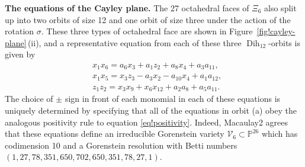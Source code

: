 \documentclass[pdftex]{sigma}
\numberwithin{equation}{section}
\theoremstyle{definition}
\newcommand{\PP}{\mathbb{P}}
\DeclareMathOperator{\Dih}{Dih}
\begin{document}
{\bf The equations of the Cayley plane.}
The 27 octahedral faces of $\Xi_6$ also split up into two orbits of size 12 and one orbit of size three under the action of the rotation $\sigma$. These three types of octahedral face are shown in Figure~\ref{fig!cayley-plane}\,(ii), and a representative equation from each of these three $\Dih_{12}$-orbits is given by
\begin{align*}
&x_1x_6=a_6x_3 + a_1z_2 +a_8x_4+a_3a_{11}, \tag{a} \\
&x_1x_5= x_3z_3 - a_3x_2 - a_{10}x_4 +a_1a_{12}, \tag{b} \\
&z_1z_2= x_3x_9 + x_6x_{12} + a_2a_8 + a_5a_{11}. \tag{c}
\end{align*}
The choice of $\pm$ sign in front of each monomial in each of these equations is uniquely determined by specifying that all of the equations in orbit (a) obey the analogous positivity rule to equation \eqref{eq!positivity}. Indeed, Macaulay2 agrees that these equations define an irreducible Gorenstein variety $\mathcal{V}_6\subset \PP^{26}$ which has codimension 10 and a Gorenstein resolution with Betti numbers~${( 1, 27, 78, 351, 650, 702, 650, 351, 78, 27, 1 )}$.
\end{document}
